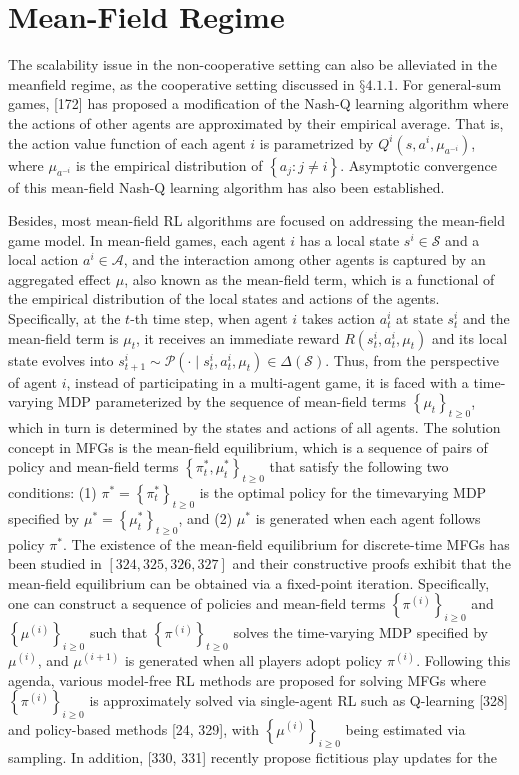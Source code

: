 \documentclass[10pt]{article}
\begin{document}
\section{Mean-Field Regime}
The scalability issue in the non-cooperative setting can also be alleviated in the meanfield regime, as the cooperative setting discussed in $§ 4.1 .1$. For general-sum games, [172] has proposed a modification of the Nash-Q learning algorithm where the actions of other agents are approximated by their empirical average. That is, the action value function of each agent $i$ is parametrized by $Q^{i}\left(s, a^{i}, \mu_{a^{-i}}\right)$, where $\mu_{a^{-i}}$ is the empirical distribution of $\left\{a_{j}: j \neq i\right\}$. Asymptotic convergence of this mean-field Nash-Q learning algorithm has also been established.

Besides, most mean-field RL algorithms are focused on addressing the mean-field game model. In mean-field games, each agent $i$ has a local state $s^{i} \in \mathcal{S}$ and a local action $a^{i} \in \mathcal{A}$, and the interaction among other agents is captured by an aggregated effect $\mu$, also known as the mean-field term, which is a functional of the empirical distribution of the local states and actions of the agents. Specifically, at the $t$-th time step, when agent $i$ takes action $a_{t}^{i}$ at state $s_{t}^{i}$ and the mean-field term is $\mu_{t}$, it receives an immediate reward $R\left(s_{t}^{i}, a_{t}^{i}, \mu_{t}\right)$ and its local state evolves into $s_{t+1}^{i} \sim \mathcal{P}\left(\cdot \mid s_{t}^{i}, a_{t}^{i}, \mu_{t}\right) \in \Delta(\mathcal{S})$. Thus, from the perspective of agent $i$, instead of participating in a multi-agent game, it is faced with a time-varying MDP parameterized by the sequence of mean-field terms $\left\{\mu_{t}\right\}_{t \geq 0}$, which in turn is determined by the states and actions of all agents. The solution concept in MFGs is the mean-field equilibrium, which is a sequence of pairs of policy and mean-field terms $\left\{\pi_{t}^{*}, \mu_{t}^{*}\right\}_{t \geq 0}$ that satisfy the following two conditions: (1) $\pi^{*}=\left\{\pi_{t}^{*}\right\}_{t \geq 0}$ is the optimal policy for the timevarying MDP specified by $\mu^{*}=\left\{\mu_{t}^{*}\right\}_{t \geq 0}$, and (2) $\mu^{*}$ is generated when each agent follows policy $\pi^{*}$. The existence of the mean-field equilibrium for discrete-time MFGs has been studied in $[324,325,326,327]$ and their constructive proofs exhibit that the mean-field equilibrium can be obtained via a fixed-point iteration. Specifically, one can construct a sequence of policies and mean-field terms $\left\{\pi^{(i)}\right\}_{i \geq 0}$ and $\left\{\mu^{(i)}\right\}_{i \geq 0}$ such that $\left\{\pi^{(i)}\right\}_{t \geq 0}$ solves the time-varying MDP specified by $\mu^{(i)}$, and $\mu^{(i+1)}$ is generated when all players adopt policy $\pi^{(i)}$. Following this agenda, various model-free RL methods are proposed for solving MFGs where $\left\{\pi^{(i)}\right\}_{i \geq 0}$ is approximately solved via single-agent RL such as Q-learning [328] and policy-based methods [24, 329], with $\left\{\mu^{(i)}\right\}_{i \geq 0}$ being estimated via sampling. In addition, [330, 331] recently propose fictitious play updates for the 
\end{document}

